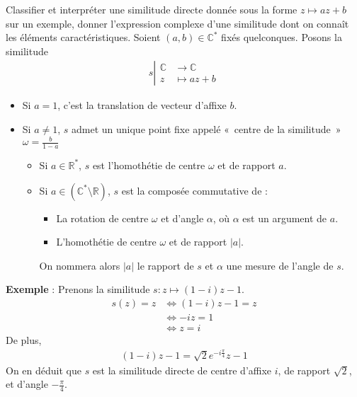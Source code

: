 \documentclass{article}
\renewenvironment{question_kholle}[2][ ]
{
	\subsection{\texorpdfstring{#2}{}}
	\notblank{#1}
	{
		\noindent #1
		\bigbreak
	}
	{}
	\begin{proof}
}
{
	\end{proof}
}
\begin{document}
\begin{question_kholle}{Classifier et interpréter une similitude directe donnée sous la forme $z \mapsto a z + b$ sur un exemple, donner l'expression complexe d'une similitude dont on connaît les éléments caractéristiques.}
	Soient $(a, b) \in \mathbb{C}^*$ fixés quelconques. Posons la similitude
	\begin{align*}
		s \left| \begin{array}{ll}
			         \mathbb{C} & \to \mathbb{C}  \\
			         z          & \mapsto a z + b
		         \end{array}\right.
	\end{align*}
	\begin{itemize}[label=$\lozenge$]
		\item Si $a = 1$, c'est la translation de vecteur d'affixe $b$.
		\item Si $a \neq 1$, $s$ admet un unique point fixe appelé «~centre de la similitude~» $\omega = \frac{b}{1-a}$
		      \begin{itemize}[label=$\star$]
			      \item Si $a \in \mathbb{R}^*$, $s$ est l'homothétie de centre $\omega$ et de rapport $a$.
			      \item Si $a \in (\mathbb{C}^* \setminus \mathbb{R})$, $s$ est la composée commutative de :
			            \begin{itemize}
				            \item La rotation de centre $\omega$ et d'angle $\alpha$, où $\alpha$ est un argument de $a$.
				            \item L'homothétie de centre $\omega$ et de rapport $|a|$.
			            \end{itemize}
			            On nommera alors $|a|$ le rapport de $s$ et $\alpha$ une mesure de l'angle de $s$.
		      \end{itemize}
	\end{itemize}
	\textbf{Exemple} : Prenons la similitude $s: z \mapsto (1 - i) z - 1$.
	\begin{align*}
		s(z) = z & \iff (1 - i)z - 1 = z \\
		         & \iff -iz = 1          \\
		         & \iff z = i
	\end{align*}
	De plus,
	\begin{align*}
		(1 - i)z - 1 = \sqrt{2}e^{-i \frac{\pi}{4}}z - 1
	\end{align*}
	On en déduit que $s$ est la similitude directe de centre d'affixe $i$, de rapport $\sqrt{2}$, et d'angle $-\frac{\pi}{4}$.
\end{question_kholle}
\end{document}
